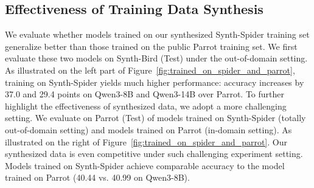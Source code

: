 \subsection{Effectiveness of Training Data Synthesis}
\label{subsec:data_effectiveness}

% 
% 


We evaluate whether models trained on our synthesized Synth-Spider training set generalize better than those trained on the public Parrot training set. 
We first evaluate these two models on Synth-Bird (Test) under the out-of-domain setting. As illustrated on the left part of Figure~\ref{fig:trained_on_spider_and_parrot}, training on Synth-Spider yields much higher performance: accuracy increases by 37.0 and 29.4 points on Qwen3-8B and Qwen3-14B over Parrot. 
To further highlight the effectiveness of synthesized data, we adopt a more challenging setting. We evaluate on Parrot (Test) of models trained on Synth-Spider (totally out-of-domain setting) and models trained on Parrot (in-domain setting). As illustrated on the right of Figure~\ref{fig:trained_on_spider_and_parrot}. Our synthesized data is even competitive under such challenging experiment setting. Models trained on Synth-Spider achieve comparable accuracy to the model trained on Parrot (40.44 vs. 40.99 on Qwen3-8B). 



